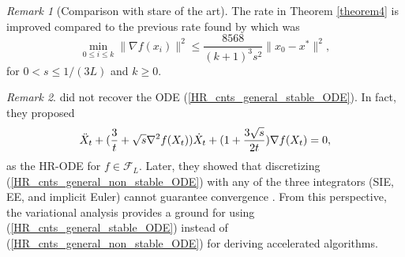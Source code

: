 \documentclass{article}
\theoremstyle{plain}
\theoremstyle{definition}
\theoremstyle{remark}
\newtheorem{remark}{Remark}[theorem]
\begin{document}
\begin{remark}[Comparison with stare of the art]
    The rate in Theorem \ref{theorem4} is improved compared to the previous rate found by \cite{Shi2021UnderstandingTA} which was 
$$ \min_{0\leq i\leq k}\|\nabla f(x_i)\|^2 \leq \frac{8568}{(k+1)^3s^2}\|x_0-x^*\|^2,$$
for $0< s\leq 1/(3L)$ and $k\geq0$.
\end{remark}
\begin{remark}
\citep{shi2019acceleration} did not recover the ODE (\ref{HR_cnts_general_stable_ODE}). In fact, they proposed 
\begin{align}\label{HR_cnts_general_non_stable_ODE}
     \Ddot{X}_t + (\frac{3}{t}+\sqrt{s}\nabla^2 f(X_t))\dot{X}_t+(1+\frac{3\sqrt{s}}{2t})\nabla f(X_t)=0,
\end{align}
as the HR-ODE for \(f\in \mathcal{F}_L\). Later, they showed that discretizing (\ref{HR_cnts_general_non_stable_ODE}) with any of the three integrators (SIE, EE, and implicit Euler) cannot guarantee convergence \cite{shi2019acceleration}. From this perspective, the variational analysis provides a ground for using (\ref{HR_cnts_general_stable_ODE}) instead of (\ref{HR_cnts_general_non_stable_ODE}) for deriving accelerated algorithms.
\end{remark}
\end{document}
